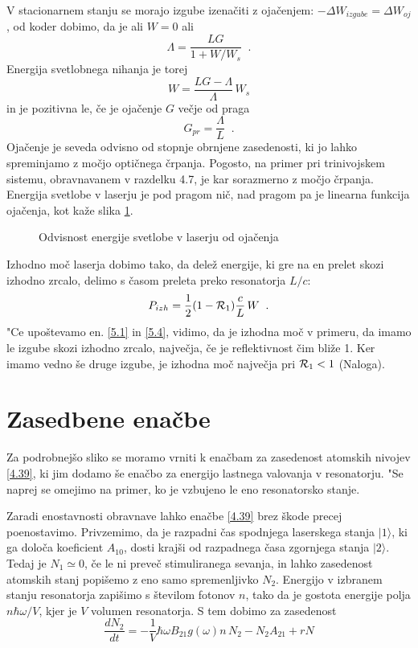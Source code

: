 V stacionarnem stanju se morajo izgube izenačiti z ojačenjem: \newline
$-\Delta W_{izgube}=\Delta W_{oj}$, od koder dobimo, da je ali $W=0$ ali 
\begin{equation}  \label{5.3}
\Lambda=\frac{LG}{1+W/W_s}\;\;.
\end{equation}
Energija svetlobnega nihanja je torej 
\begin{equation}  \label{5.4}
W=\frac{LG-\Lambda}{\Lambda}\,W_s
\end{equation}
in je pozitivna le, če je ojačenje $G$ večje od praga 
\begin{equation}  \label{5.5}
G_{pr}=\frac{\Lambda}{L}\;\;.
\end{equation}
Ojačenje je seveda odvisno od stopnje obrnjene zasedenosti, ki jo lahko
spreminjamo z močjo optičnega črpanja. Pogosto, na primer pri
trinivojskem sistemu, obravnavanem v razdelku 4.7, je kar sorazmerno z
močjo črpanja. Energija svetlobe v laserju je pod pragom nič, nad pragom
pa je linearna funkcija ojačenja, kot kaže slika \ref{s5.2}.

\begin{figure}[tbp]
\label{s5.2} \vskip 5cm
\caption{Odvisnost energije svetlobe v laserju od ojačenja}
\end{figure}

Izhodno moč laserja dobimo tako, da delež energije, ki gre na en prelet
skozi izhodno zrcalo, delimo s časom preleta preko resonatorja $L/c$: 
\begin{equation}
P_{izh}=\frac{1}{2}(1-{\cal {R}}_{1})\frac{c}{L}\,W\;\;.  \label{5.6}
\end{equation}
"Ce upoštevamo en. \ref{5.1} in \ref{5.4}, vidimo, da je izhodna moč v
primeru, da imamo le izgube skozi izhodno zrcalo, največja, če je
reflektivnost čim bliže 1. Ker imamo vedno še druge izgube, je izhodna
moč največja pri ${\cal {R}}_{1}<1$ (Naloga).

\section{Zasedbene enačbe}

Za podrobnejšo sliko se moramo vrniti k enačbam za zasedenost atomskih
nivojev \ref{4.39}, ki jim dodamo še enačbo za energijo lastnega valovanja
v resonatorju. "Se naprej se omejimo na primer, ko je vzbujeno le eno
resonatorsko stanje.

Zaradi enostavnosti obravnave lahko enačbe \ref{4.39} brez škode precej
poenostavimo. Privzemimo, da je razpadni čas spodnjega laserskega stanja $%
|1\rangle$, ki ga določa koeficient $A_{10}$, dosti krajši od razpadnega
časa zgornjega stanja $|2\rangle$. Tedaj je $N_1\simeq0$, če le ni preveč
stimuliranega sevanja, in lahko zasedenost atomskih stanj popišemo z eno
samo spremenljivko $N_2$. Energijo v izbranem stanju resonatorja zapišimo s
števi\-lom fotonov $n$, tako da je gostota energije polja $n\hbar\omega/V$,
kjer je $V$ volumen resonatorja. S tem dobimo za zasedenost 
\begin{equation}  \label{5.7}
\frac{dN_2}{dt}=- \frac{1}{V}\hbar\omega B_{21}g(\omega)n\,N_2-N_2A_{21}+rN
\end{equation}

